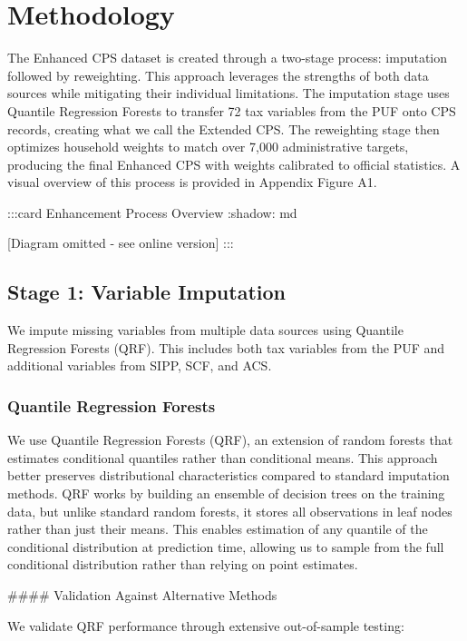 \section{Methodology}

The Enhanced CPS dataset is created through a two-stage process: imputation followed by reweighting. This approach leverages the strengths of both data sources while mitigating their individual limitations. The imputation stage uses Quantile Regression Forests to transfer 72 tax variables from the PUF onto CPS records, creating what we call the Extended CPS. The reweighting stage then optimizes household weights to match over 7,000 administrative targets, producing the final Enhanced CPS with weights calibrated to official statistics. A visual overview of this process is provided in Appendix Figure A1.

:::{card} Enhancement Process Overview
:shadow: md

[Diagram omitted - see online version]
:::

\subsection{Stage 1: Variable Imputation}

We impute missing variables from multiple data sources using Quantile Regression Forests (QRF). This includes both tax variables from the PUF and additional variables from SIPP, SCF, and ACS.

\subsubsection{Quantile Regression Forests}

We use Quantile Regression Forests (QRF), an extension of random forests that estimates conditional quantiles rather than conditional means. This approach better preserves distributional characteristics compared to standard imputation methods. QRF works by building an ensemble of decision trees on the training data, but unlike standard random forests, it stores all observations in leaf nodes rather than just their means. This enables estimation of any quantile of the conditional distribution at prediction time, allowing us to sample from the full conditional distribution rather than relying on point estimates.

\#\#\#\# Validation Against Alternative Methods

We validate QRF performance through extensive out-of-sample testing:

